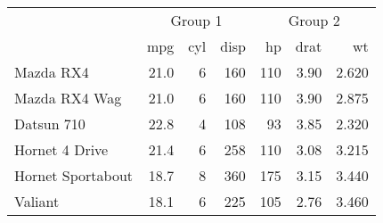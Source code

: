 \documentclass[]{book}
\theoremstyle{definition}
\theoremstyle{definition}
\theoremstyle{definition}
\theoremstyle{remark}
\begin{document}
\begin{tabular}{l|r|r|r|r|r|r}
\hline
\multicolumn{1}{c|}{ } & \multicolumn{3}{|c|}{Group 1} & \multicolumn{3}{|c}{Group 2} \\
\cline{2-4} \cline{5-7}
  & mpg & cyl & disp & hp & drat & wt\\
\hline
Mazda RX4 & 21.0 & 6 & 160 & 110 & 3.90 & 2.620\\
\hline
Mazda RX4 Wag & 21.0 & 6 & 160 & 110 & 3.90 & 2.875\\
\hline
Datsun 710 & 22.8 & 4 & 108 & 93 & 3.85 & 2.320\\
\hline
Hornet 4 Drive & 21.4 & 6 & 258 & 110 & 3.08 & 3.215\\
\hline
Hornet Sportabout & 18.7 & 8 & 360 & 175 & 3.15 & 3.440\\
\hline
Valiant & 18.1 & 6 & 225 & 105 & 2.76 & 3.460\\
\hline
\end{tabular}


\end{document}

